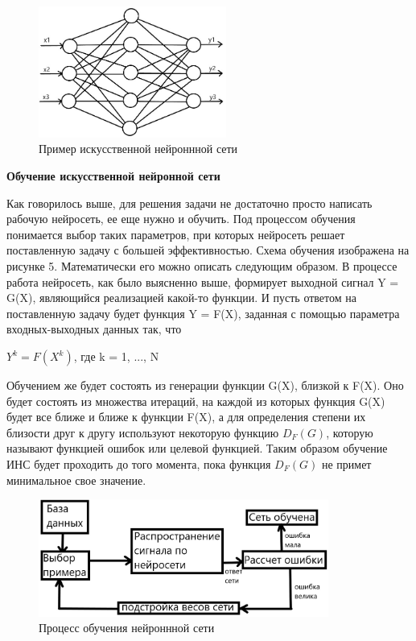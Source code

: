 \documentclass[bachelor, och, coursework]{shiza}
\begin{document}
\begin{figure}[H]
    \centering
    \includegraphics[width=0.55\textwidth]{4}
    \caption{Пример искусственной нейроннной сети}
    \label{fig:img1}
\end{figure}

\begin{center}
    \textbf{Обучение искусственной нейронной сети}
\end{center}

Как говорилось выше, для решения задачи не достаточно просто написать рабочую нейросеть, ее еще нужно и обучить. Под процессом обучения понимается выбор
таких параметров, при которых нейросеть решает поставленную задачу с большей эффективностью. Схема обучения изображена на рисунке 5. Математически его 
можно описать следующим образом. В процессе работа нейросеть, как было выясненно выше, формирует выходной сигнал Y = G(X), являющийся реализацией какой-то
функции. И пусть ответом на поставленную задачу будет функция Y = F(X), заданная с помощью параметра входных-выходных данных так, что

\begin{center}
    $Y^k = F(X^k)$, где k = 1, ..., N
\end{center}

Обучением же будет состоять из генерации функции G(X), близкой к F(X). Оно будет состоять из множества итераций, на каждой из которых функция G(X) будет
все ближе и ближе к функции F(X), а для определения степени их близости друг к другу используют некоторую функцию $D_F(G)$, которую называют функцией ошибок или
целевой функцией. Таким образом обучение ИНС будет проходить до того момента, пока функция $D_F(G)$ не примет минимальное свое значение.

\begin{figure}[H]
    \centering
    \includegraphics[width=0.85\textwidth]{5}
    \caption{Процесс обучения нейроннной сети}
    \label{fig:img1}
\end{figure}
\end{document}
